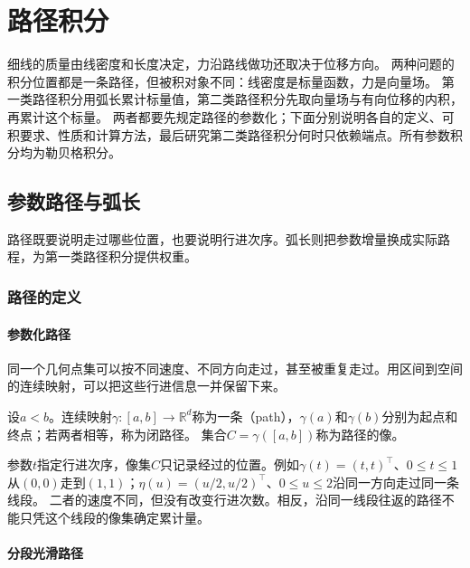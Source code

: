 \par{}
\section{路径积分}
\label{sec:multivariable-path-integration}

细线的质量由线密度和长度决定，力沿路线做功还取决于位移方向。
两种问题的积分位置都是一条路径，但被积对象不同：线密度是标量函数，力是向量场。
第一类路径积分用弧长累计标量值，第二类路径积分先取向量场与有向位移的内积，再累计这个标量。
两者都要先规定路径的参数化；下面分别说明各自的定义、可积要求、性质和计算方法，最后研究第二类路径积分何时只依赖端点。所有参数积分均为勒贝格积分。

\subsection{参数路径与弧长}
\label{sec:multivariable-line-integrals}

路径既要说明走过哪些位置，也要说明行进次序。弧长则把参数增量换成实际路程，为第一类路径积分提供权重。

\subsubsection{路径的定义}

\paragraph{参数化路径}

同一个几何点集可以按不同速度、不同方向走过，甚至被重复走过。用区间到空间的连续映射，可以把这些行进信息一并保留下来。
\begin{definition}[路径]
设$a<b$。连续映射$\gamma:[a,b]\to\mathbb R^d$称为一条（path），$\gamma(a)$和$\gamma(b)$分别为起点和终点；若两者相等，称为闭路径。
集合$C=\gamma([a,b])$称为路径的像。
\end{definition}

参数$t$指定行进次序，像集$C$只记录经过的位置。例如$\gamma(t)=(t,t)^\top$、$0\leq t\leq1$从$(0,0)$走到$(1,1)$；$\eta(u)=(u/2,u/2)^\top$、$0\leq u\leq2$沿同一方向走过同一条线段。
二者的速度不同，但没有改变行进次数。相反，沿同一线段往返的路径不能只凭这个线段的像集确定累计量。

\paragraph{分段光滑路径}

